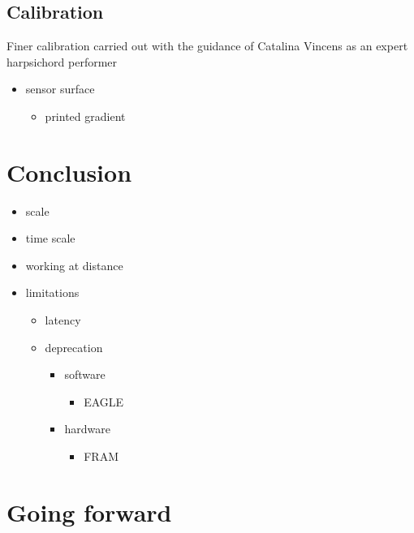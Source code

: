 \subsection{Calibration}\label{calibration}

Finer calibration carried out with the guidance of Catalina Vincens as
an expert harpsichord performer

\begin{itemize}
\tightlist
\item
  sensor surface

  \begin{itemize}
  \tightlist
  \item
    printed gradient
  \end{itemize}
\end{itemize}

\section{Conclusion}\label{conclusion}

\begin{itemize}
\tightlist
\item
  scale
\item
  time scale
\item
  working at distance
\item
  limitations

  \begin{itemize}
  \tightlist
  \item
    latency
  \item
    deprecation

    \begin{itemize}
    \tightlist
    \item
      software

      \begin{itemize}
      \tightlist
      \item
        EAGLE
      \end{itemize}
    \item
      hardware

      \begin{itemize}
      \tightlist
      \item
        FRAM
      \end{itemize}
    \end{itemize}
  \end{itemize}
\end{itemize}

\section{Going forward}\label{going-forward}

